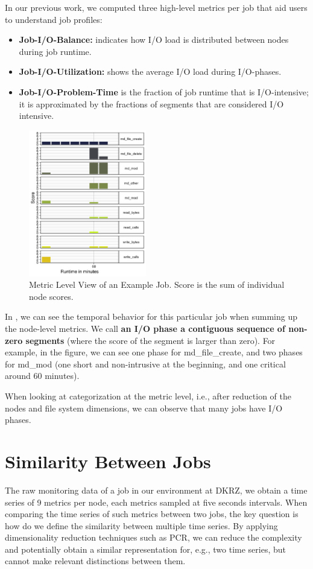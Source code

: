 \documentclass[]{llncs}
\begin{document}
In our previous work, we computed three high-level metrics per job that aid users to understand job profiles: 

\begin{itemize}
 \item \textbf{Job-I/O-Balance:} indicates how I/O load is distributed between nodes during job runtime.
 \item \textbf{Job-I/O-Utilization:} shows the average I/O load during I/O-phases.
 \item \textbf{Job-I/O-Problem-Time} is the fraction of job runtime that is I/O-intensive; it is approximated by the fractions of segments that are considered I/O intensive.
\end{itemize}

\begin{figure}
	\centering
	 \includegraphics[width=2.02in,height=2.52in]{./media/image4.png}
	 \caption{Metric Level View of an Example Job. Score is the sum of individual node scores.}
	 \label{fig:seg_example}
\end{figure}

In , we can see the temporal behavior for this particular job when summing up the node-level metrics.
We call \textbf{an I/O phase a contiguous sequence of non-zero segments} (where the score of the segment is larger than zero).
For example, in the figure, we can see one phase for md\_file\_create, and two phases for md\_mod (one short and non-intrusive at the beginning, and one critical around 60 minutes).

When looking at categorization at the metric level, i.e., after reduction of the nodes and file system dimensions, we can observe that many jobs have I/O phases. 

\section{Similarity Between Jobs}
The raw monitoring data of a job in our environment at DKRZ, we obtain a time series of 9 metrics per node, each metrics sampled at five seconds intervals.
When comparing the time series of such metrics between two jobs, the key question is how do we define the similarity between multiple time series.
By applying dimensionality reduction techniques such as PCR, we can reduce the complexity and potentially obtain a similar representation for, e.g., two time series, but cannot make relevant distinctions between them.
\end{document}
